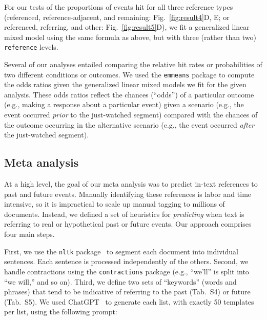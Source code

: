 \documentclass[10pt]{article}
\newcommand{\pastKeys}{S4}
\newcommand{\futureKeys}{S5}
\begin{document}
For our tests of the proportions of events hit for all three reference types (referenced, reference-adjacent, and remaining: Fig.~\ref{fig:result4}D, E; or referenced, referring, and other: Fig.~\ref{fig:result5}D), we fit a generalized linear mixed model using the same formula as above, but with three (rather than two) \texttt{reference} levels.

Several of our analyses entailed comparing the relative hit rates or probabilities of two different conditions or outcomes. We used the \texttt{emmeans} package to compute the odds ratios given the generalized linear mixed models we fit for the given analysis. These odds ratios reflect the chances (``odds'') of a particular outcome (e.g., making a response about a particular event) given a scenario (e.g., the event occurred \textit{prior} to the just-watched segment) compared with the chances of the outcome occurring in the alternative scenario (e.g., the event occurred \textit{after} the just-watched segment).

\subsection*{Meta analysis}

At a high level, the goal of our meta analysis was to predict in-text references to past and future events. Manually identifying these references is labor and time intensive, so it is impractical to scale up manual tagging to millions of documents. Instead, we defined a set of heuristics for \textit{predicting} when text is referring to real or hypothetical past or future events. Our approach comprises four main steps.

First, we use the \texttt{nltk} package~\citep{BirdEtal09} to segment each document into individual sentences. Each sentence is processed independently of the others. Second, we handle contractions using the \texttt{contractions} package (e.g., ``we'll'' is split into ``we will,'' and so on).  Third, we define two sets of ``keywords'' (words and phrases) that tend to be indicative of referring to the past (Tab.~\pastKeys) or future (Tab.~\futureKeys). We used ChatGPT~\citep{ChatGPT} to generate each list, with exactly 50 templates per list, using the following prompt:
\end{document}
